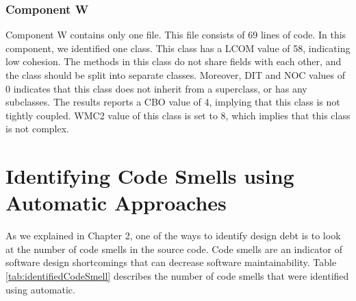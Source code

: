  





\subsubsection{Component W}
Component W contains only one file. This file consists of 69 lines of code. In this component, we identified one class. This class has a LCOM value of 58, indicating low cohesion. The methods in this class do not share fields with each other, and the class should be split into separate classes. Moreover, DIT and NOC values of 0 indicates that this class does not inherit from a superclass, or has any subclasses. The results reports a CBO value of 4, implying that this class is not tightly coupled. WMC2 value of this class is set to 8, which implies that this class is not complex.































\section{Identifying Code Smells using Automatic Approaches}
\label{sub:code_smell_detection}
As we explained in Chapter 2, one of the ways to identify design debt is to look at the number of code smells in the source code. Code smells are an indicator of software design shortcomings that can decrease software maintainability. Table \ref{tab:identifiedCodeSmell} describes the number of code smells that were identified using automatic.

